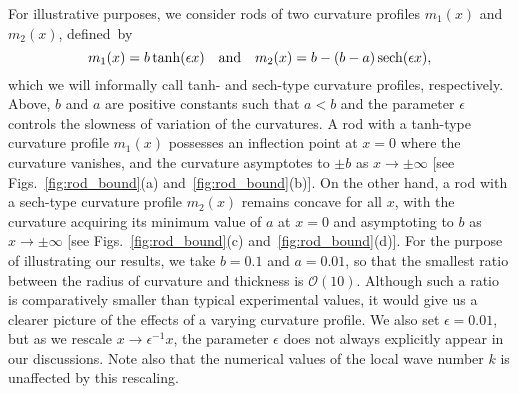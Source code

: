 For illustrative purposes, we consider rods of two curvature profiles $m_{1}(x)$ and $m_{2}(x)$, defined~by
%
\begin{equation}
  m_{1}(x) = b\tanh(\epsilon x)
  \quad\text{and}\quad
  m_{2}(x) = b - \left(b - a\right)\operatorname{sech}(\epsilon x),
  \label{eq:rod_curv}
\end{equation}
%
which we will informally call tanh- and sech-type curvature profiles, respectively.
Above, $b$ and $a$ are positive constants such that $a < b$ and the parameter $\epsilon$ controls the slowness of variation of the curvatures.
A rod with a tanh-type curvature profile $m_{1}(x)$ possesses an inflection point at $x=0$ where the curvature vanishes, and the curvature asymptotes to $\pm b$ as $x\to \pm\infty$ [see Figs.~\ref{fig:rod_bound}(a) and~\ref{fig:rod_bound}(b)].
On the other hand, a rod with a sech-type curvature profile $m_{2}(x)$ remains concave for all $x$, with the curvature acquiring its minimum value of $a$ at $x = 0$ and asymptoting to $b$ as $x\to\pm\infty$ [see Figs.~\ref{fig:rod_bound}(c) and~\ref{fig:rod_bound}(d)].
For the purpose of illustrating our results, we take $b = 0.1$ and $a = 0.01$, so that the smallest ratio between the radius of curvature and thickness is $\mathcal{O}(10)$.
Although such a ratio is comparatively smaller than typical experimental values, it would give us a clearer picture of the effects of a varying curvature profile.
We also set $\epsilon = 0.01$, but as we rescale $x \to \epsilon^{-1}x$, the parameter $\epsilon$ does not always explicitly appear in our discussions.
Note also that the numerical values of the local wave number $k$ is unaffected by this rescaling.

